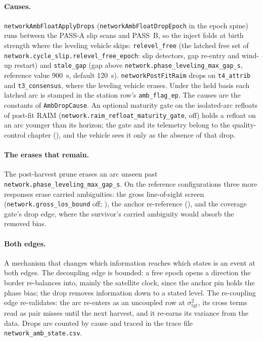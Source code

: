\documentclass[main.tex]{subfiles}
\begin{document}
\paragraph{Causes.}
\texttt{networkAmbFloatApplyDrops} (\texttt{networkAmbFloatDropEpoch} in
the epoch spine) runs between the PASS-A slip scans and PASS~B, so the
inject folds at birth strength where the leveling vehicle skips:
\texttt{relevel\_free} (the latched free set of
\texttt{network.cycle\_slip.relevel\_free\_epoch}: slip detectors, gap
re-entry and wind-up restart) and \texttt{stale\_gap} (gap above
\texttt{network.phase\_leveling\_max\_gap\_s}, reference value 900~s,
default 120~s). \texttt{networkPostFitRaim} drops on \texttt{t4\_attrib}
and \texttt{t3\_consensus}, where the leveling vehicle erases. Under the
held basis each latched arc is stamped in the station row's
\texttt{amb\_flag\_ep}. The causes are the constants of
\texttt{AmbDropCause}. An optional maturity gate on the isolated-arc
refloats of post-fit RAIM (\texttt{network.raim\_refloat\_maturity\_gate},
off) holds a refloat on an arc younger than its horizon; the gate and its
telemetry belong to the quality-control chapter
(), and the vehicle
sees it only as the absence of that drop.

\paragraph{The erases that remain.}
The post-harvest prune erases an arc unseen past
\texttt{network.phase\_leveling\_max\_gap\_s}. On the reference
configurations three more responses erase carried ambiguities: the gross
line-of-sight screen (\texttt{network.gross\_los\_bound} off;
), the anchor re-reference
(), and the coverage gate's drop edge, where the
survivor's carried ambiguity would absorb the removed bias.

\paragraph{Both edges.}
A mechanism that changes which information reaches which states is an event
at both edges. The decoupling edge is bounded: a free epoch opens a
direction the border re-balances into, mainly the satellite clock, since the
anchor pin holds the phase bias; the drop removes information down to a
stated level. The re-coupling edge re-validates: the arc re-enters as an
uncoupled row at $\sigma^2_{\mathrm{tgt}}$, its cross terms read as pair
misses until the next harvest, and it re-earns its variance from the data.
Drops are counted by cause and traced in the trace file
\texttt{network\_amb\_state.csv}.
\end{document}
